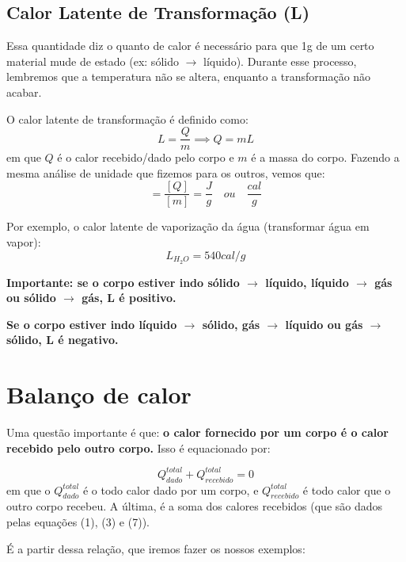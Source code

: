 \documentclass[12pt]{extarticle}
\newcommand{\<}{\langle}
\renewcommand{\>}{\rangle}
\theoremstyle{definition}
\begin{document}
\subsection{Calor Latente de Transformação (L)}

Essa quantidade diz o quanto de calor é necessário para que 1g de um certo material mude de estado (ex: sólido $\rightarrow$ líquido). Durante esse processo, lembremos que a temperatura não se altera, enquanto a transformação não acabar.

O calor latente de transformação é definido como:
\begin{equation}
    L = \frac{Q}{m} \implies Q =mL
\end{equation}
\noindent em que $Q$ é o calor recebido/dado pelo corpo e $m$ é a massa do corpo. Fazendo a mesma análise de unidade que fizemos para os outros, vemos que:
\begin{equation}
    [L] = \frac{[Q]}{[m]} = \frac{J}{g} \quad  ou \quad \frac{cal}{g}
\end{equation}

Por exemplo, o calor latente de vaporização da água (transformar água em vapor):
\begin{equation}
    L_{H_2O} = 540 cal/g
\end{equation}

\textbf{Importante: se o corpo estiver indo sólido $\rightarrow$ líquido, líquido $\rightarrow$ gás ou sólido $\rightarrow$ gás, L é positivo.}

\textbf{Se o corpo estiver indo líquido $\rightarrow$ sólido, gás $\rightarrow$ líquido ou gás $\rightarrow$ sólido, L é negativo.}

\section{Balanço de calor}

Uma questão importante é que: \textbf{o calor fornecido por um corpo é o calor recebido pelo outro corpo.} Isso é equacionado por:

\begin{equation}
    Q_{dado}^{total} + Q_{recebido}^{total} =0
\end{equation}
\noindent em que o $Q_{dado}^{total}$ é o todo calor dado por um corpo,  e $Q_{recebido}^{total}$ é todo calor que o outro corpo recebeu. A última, é a soma dos calores recebidos (que são dados pelas equações (1), (3) e (7)).

É a partir dessa relação, que iremos fazer os nossos exemplos:
\end{document}
